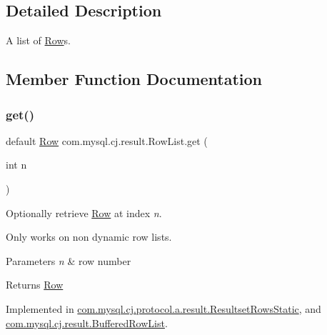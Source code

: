 \subsection{Detailed Description}
A list of \mbox{\hyperlink{interfacecom_1_1mysql_1_1cj_1_1result_1_1_row}{Row}}s. 

\subsection{Member Function Documentation}
\mbox{\label{interfacecom_1_1mysql_1_1cj_1_1result_1_1_row_list_ac5f33b198acdb87ba7ab84da6cddef93}} 
\subsubsection{\texorpdfstring{get()}{get()}}
{\footnotesize\ttfamily default \mbox{\hyperlink{interfacecom_1_1mysql_1_1cj_1_1result_1_1_row}{Row}} com.\+mysql.\+cj.\+result.\+Row\+List.\+get (\begin{DoxyParamCaption}\item[{int}]{n }\end{DoxyParamCaption})}

Optionally retrieve \mbox{\hyperlink{interfacecom_1_1mysql_1_1cj_1_1result_1_1_row}{Row}} at index {\itshape n}.

Only works on non dynamic row lists.


\begin{DoxyParams}{Parameters}
{\em n} & row number \\
\hline
\end{DoxyParams}
\begin{DoxyReturn}{Returns}
\mbox{\hyperlink{interfacecom_1_1mysql_1_1cj_1_1result_1_1_row}{Row}} 
\end{DoxyReturn}


Implemented in \mbox{\hyperlink{classcom_1_1mysql_1_1cj_1_1protocol_1_1a_1_1result_1_1_resultset_rows_static_a142d0e620806f94e5e35b761587bda0d}{com.\+mysql.\+cj.\+protocol.\+a.\+result.\+Resultset\+Rows\+Static}}, and \mbox{\hyperlink{classcom_1_1mysql_1_1cj_1_1result_1_1_buffered_row_list_a84d3adb0ccd22e7ea988a25a6421948a}{com.\+mysql.\+cj.\+result.\+Buffered\+Row\+List}}.

